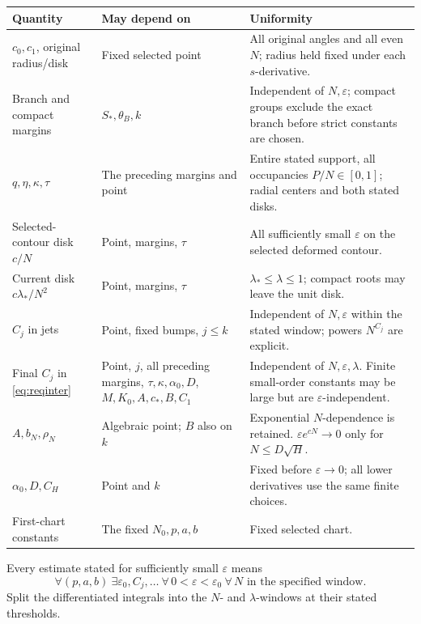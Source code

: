 \documentclass[11pt]{article}
\numberwithin{equation}{section}
\theoremstyle{definition}
\newcommand{\eps}{\varepsilon}
\begin{document}
\begin{longtable}{>{\raggedright\arraybackslash}p{}>{\raggedright\arraybackslash}p{}>{\raggedright\arraybackslash}p{}}
\toprule
Quantity & May depend on & Uniformity\\
\midrule
\endhead
\(c_0,c_1\), original radius/disk &
Fixed selected point & All original angles and all even \(N\);
radius held fixed under each \(s\)-derivative.\\
Branch and compact margins &
\(S_*,\theta_B,k\) & Independent of \(N,\eps\); compact groups
exclude the exact branch before strict constants are chosen.\\
\(q,\eta,\kappa,\tau\) &
The preceding margins and point & Entire stated support, all
occupancies \(P/N\in[0,1]\); radial centers and both stated disks.\\
Selected-contour disk \(c/N\) &
Point, margins, \(\tau\) & All sufficiently small \(\eps\) on
the selected deformed contour.\\
Current disk \(c\lambda_*/N^2\) &
Point, margins, \(\tau\) & \(\lambda_*\le\lambda\le1\);
compact roots may leave the unit disk.\\
\(C_j\) in jets &
Point, fixed bumps, \(j\le k\) & Independent of \(N,\eps\) within
the stated window; powers \(N^{C_j}\) are explicit.\\
Final \(C_j\) in \eqref{eq:reqinter} &
Point, \(j\), all preceding margins, \(\tau,\kappa,\alpha_0,D\),
\(M,K_0,A,c_*,B,C_1\) & Independent of \(N,\eps,\lambda\).
Finite small-order constants may be large but are
\(\eps\)-independent.\\
\(A,b_N,\rho_N\) &
Algebraic point; \(B\) also on \(k\) & Exponential \(N\)-dependence
is retained. \(\eps e^{cN}\to0\) only for \(N\le D\sqrt H\).\\
\(\alpha_0,D,C_H\) &
Point and \(k\) & Fixed before \(\eps\to0\); all lower derivatives
use the same finite choices.\\
First-chart constants &
The fixed \(N_0,p,a,b\) & Fixed selected chart.\\
\bottomrule
\end{longtable}

Every estimate stated for sufficiently small \(\eps\) means
\[
 \forall(p,a,b)\ \exists\eps_0,C_j,\ldots\
 \forall\,0<\eps<\eps_0\
 \forall\,N\text{ in the specified window}.
\]
Split the differentiated integrals into the \(N\)- and
\(\lambda\)-windows at their stated thresholds.
\end{document}
